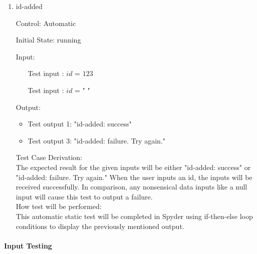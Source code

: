 \documentclass[12pt, titlepage]{article}
\newcounter{tinnum} %
\begin{document}
\begin{enumerate}

\item{id-added\\}

Control: Automatic
					
Initial State: \progname{} running

Input:

\begin{itemize}
\item[Test input \refstepcounter{tinnum}\thetinnum\label{Tinput_1}:] $id$ = 
$123$%
\item[Test input \refstepcounter{tinnum}\thetinnum\label{Tinput_2}:] $id$ = "   
"%
\end{itemize}


Output: 
\begin{itemize}
\item Test output 1: "id-added: success"
\item Test output 3: "id-added: failure. Try again."
\end{itemize}

Test Case Derivation:\\
The expected result for the given inputs will be either "id-added: success" or  
"id-added: failure. Try again." When the user inputs an id, the inputs will be 
received successfully. In comparison, any nonsensical data inputs like a null 
input will cause this test to output a failure.\\

How test will be performed: \\
This automatic static test will be completed in Spyder using if-then-else loop 
conditions to display the previously mentioned output. \\
\end{enumerate}

\paragraph{Input Testing}
\end{document}
